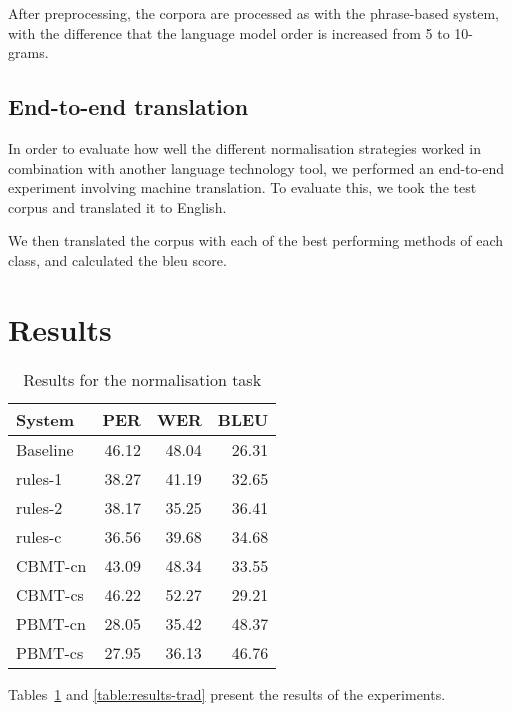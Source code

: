 \documentclass[11pt]{article}
\begin{document}
After preprocessing, the corpora are processed as with the phrase-based system, with the difference that the language model order is increased from 5 to 10-grams.

\subsection{End-to-end translation}

In order to evaluate how well the different normalisation strategies worked in 
combination with another language technology tool, we performed an end-to-end experiment
involving machine translation.
To evaluate this, we took the test corpus and translated it to English. 

We then translated the corpus with each of the best performing methods of each class, and 
calculated the {\sc bleu} score.

\section{Results}

\begin{table}
  \centering
  \begin{tabular}{|l|r|r|r|}
     \hline
    \textbf{System} & \textbf{PER} & \textbf{WER} & \textbf{BLEU} \\
     \hline
     Baseline & 46.12 & 48.04 & 26.31 \\
     \hline
     rules-1 & 38.27 & 41.19 & 32.65 \\
     rules-2 & 38.17 & 35.25 & 36.41 \\
     rules-c & 36.56 & 39.68 & 34.68 \\
     \hline
     CBMT-cn & 43.09 & 48.34 & 33.55 \\
     CBMT-cs & 46.22 & 52.27 & 29.21 \\
     PBMT-cn & 28.05 & 35.42 & 48.37 \\
     PBMT-cs & 27.95 & 36.13 & 46.76 \\
     \hline
  \end{tabular}
  \caption{Results for the normalisation task}
  \label{table:results-norm}
\end{table}

Tables~\ref{table:results-norm} and \ref{table:results-trad} present the results of the experiments.
\end{document}
